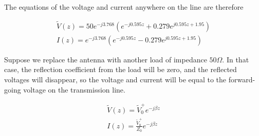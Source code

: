 \documentclass{ximera}
\begin{document}
\begin{example}
\begin{explanation}
The equations of the voltage and current anywhere on the line are therefore

\begin{eqnarray}
\tilde{V}(z)= 50  e^{-j3.768} (e^{-j 0.595 z} + 0.279  e^{j 0.595 z + 1.95}  ) \\
I(z)=   e^{-j3.768}   (e^{-j 0.595 z} - 0.279  e^{j 0.595 z+ 1.95}  ) 
\end{eqnarray}

Suppose we replace the antenna with another load of impedance $50\Omega$. In that case, the reflection coefficient from the load will be zero, and the reflected voltages will disappear, so the voltage and current will be equal to the forward-going voltage on the transmission line. 


\begin{eqnarray}
\tilde{V}(z)= \tilde{V}_0^+ e^{-j \beta z}   \\
I(z)=   \frac{\tilde{V}_0^+}{Z_0}  e^{-j \beta z} 
\end{eqnarray}


\end{explanation}




\end{example}
\end{document}
